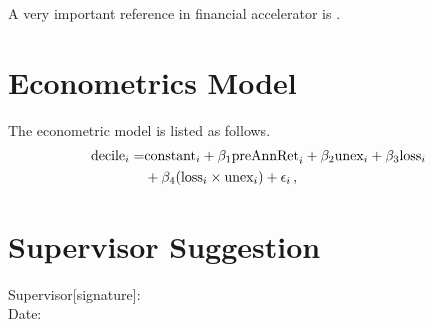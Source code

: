 \documentclass[a4paper,UTF8, 12pt]{article}
\begin{document}
   A very important reference in financial accelerator is \citet*{BGG99}.

   \section{Econometrics Model}
    The econometric model is listed as follows.
   \begin{align}\label{econ model}
      \text{decile}_i  = & \text{constant}_i + \beta_1\text{preAnnRet}_i +\beta_2\text{unex}_i + \beta_3\text{loss}_i \,\notag \\
      & + \beta_4(\text{loss}_i\times\text{unex}_i) + \epsilon_i\,,
   \end{align}





\makeatletter\renewcommand{\@biblabel}[1]{[#1].}\makeatother
{}


\newpage
\section*{Supervisor Suggestion}



\vfill


  \begin{flushright}
    Supervisor[signature]:~\underline{\qquad \qquad \qquad \qquad \qquad }\\
    \vskip 1cm
    Date:~ \underline{\qquad \qquad \qquad \qquad \qquad }
  \end{flushright}

  \vskip 2cm
\end{document}
